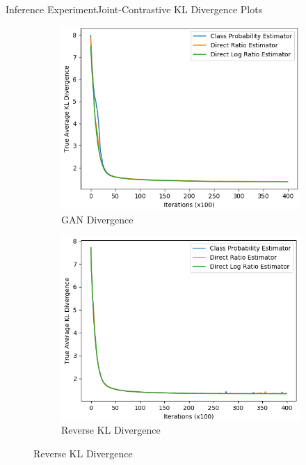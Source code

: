 \documentclass{beamer}
\begin{document}
\begin{frame}{Inference Experiment}{Joint-Contrastive KL Divergence Plots}
\begin{figure}
\begin{subfigure}{0.49\textwidth}
\includegraphics[width=\linewidth]{truklmins/JCADVvsJCADVexpvsJCADVgudlog.png}
\caption{GAN Divergence}
\end{subfigure}
\begin{subfigure}{0.49\textwidth}
\includegraphics[width=\linewidth]{truklmins/JCKLDvsJCKLexpvsJCKLgudlog.png}
\caption{Reverse KL Divergence}
\end{subfigure}
\end{figure}
\end{frame}
\end{document}
